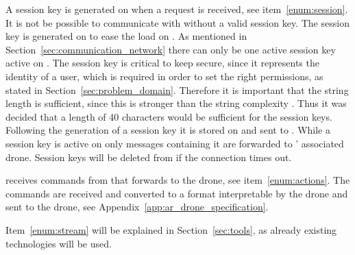 A session key is generated on  when a request is received, see item~\ref{enum:session}.
It is not be possible to communicate with  without a valid session key.
The session key is generated on  to ease the load on .
As mentioned in Section~\ref{sec:communication_network} there can only be one active session key active on .
The session key is critical to keep secure, since it represents the identity of a user, which is required in order to set the right permissions, as stated in Section~\ref{sec:problem_domain}.
Therefore it is important that the string length is sufficient, since this is stronger than the string complexity \citep{password_length}.
Thus it was decided that a length of 40 characters would be sufficient for the session keys.
Following the generation of a session key it is stored on  and sent to .
While a session key is active on  only messages containing it are forwarded to ' associated drone.
Session keys will be deleted from  if the connection times out.

 receives commands from  that  forwards to the drone, see item~\ref{enum:actions}.
The commands are received and converted to a format interpretable by the drone and sent to the drone, see Appendix~\ref{app:ar_drone_specification}.

Item~\ref{enum:stream} will be explained in Section~\ref{sec:tools}, as already existing technologies will be used.



